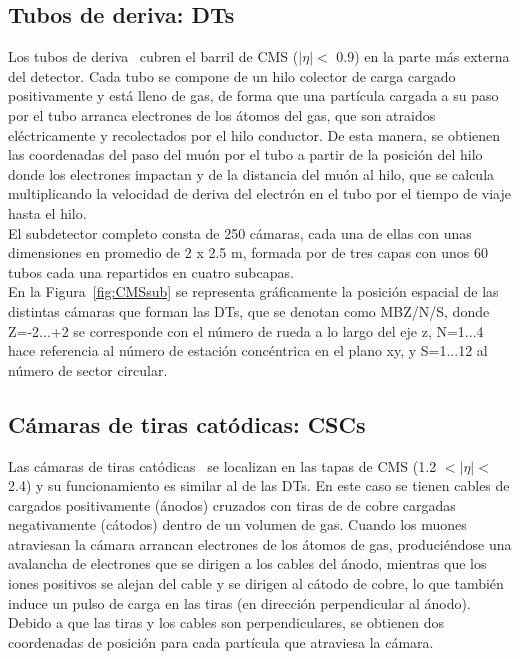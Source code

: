 \subsection{Tubos de deriva: DTs}\label{sec:DTs}

Los tubos de deriva~\cite{DTperformance} cubren el barril de CMS ($\lvert \eta \rvert <$ 0.9) en la parte m\'as externa del detector. Cada tubo se compone de un hilo colector de carga cargado positivamente y est\'a lleno de gas, de forma que una part\'icula cargada a su paso por el tubo arranca electrones de los \'atomos del gas, que son atraidos el\'ectricamente y recolectados por el hilo conductor. De esta manera, se obtienen las coordenadas del paso del mu\'on por el tubo a partir de la posici\'on del hilo donde los electrones impactan y de la distancia del mu\'on al hilo, que se calcula multiplicando la velocidad de deriva del electr\'on en el tubo por el tiempo de viaje hasta el hilo. \\

El subdetector completo consta de 250 c\'amaras, cada una de ellas con unas dimensiones en promedio de 2 x 2.5 m, formada por de tres capas con unos 60 tubos cada una repartidos en cuatro subcapas. \\
En la Figura~\ref{fig:CMSsub} se representa gr\'aficamente la posici\'on espacial de las distintas c\'amaras que forman las DTs, que se denotan como MBZ/N/S, donde Z=-2...+2 se corresponde con el n\'umero de rueda a lo largo del eje z, N=1...4 hace referencia al n\'umero de estaci\'on conc\'entrica en el plano xy, y S=1...12 al n\'umero de sector circular. 


\subsection{C\'amaras de tiras cat\'odicas: CSCs}\label{sec:CSCs}

Las c\'amaras de tiras cat\'odicas~\cite{CSCperformance} se localizan en las tapas de CMS (1.2 $< \lvert \eta \rvert <$ 2.4) y su funcionamiento es similar al de las DTs. En este caso se tienen cables de cargados positivamente (\'anodos) cruzados con tiras de de cobre cargadas negativamente (c\'atodos) dentro de un volumen de gas. Cuando los muones atraviesan la c\'amara arrancan electrones de los \'atomos de gas, produci\'endose una avalancha de electrones que se dirigen a los cables del \'anodo, mientras que los iones positivos se alejan del cable y se dirigen al c\'atodo de cobre, lo que tambi\'en induce un pulso de carga en las tiras (en direcci\'on perpendicular al \'anodo). Debido a que las tiras y los cables son perpendiculares, se obtienen dos coordenadas de posici\'on para cada part\'icula que atraviesa la c\'amara. \\

